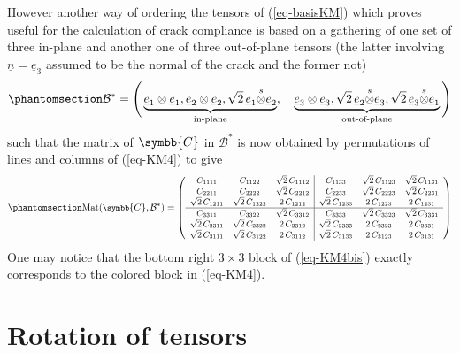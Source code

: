 \documentclass[
  a4paper,
  numbers=noendperiod,
  DIV=12]{scrreprt}
\newcommand{\uuuu}[1]{{\symbb{{#1}}}}
\newcommand{\uv}[1]{{\underline{{#1}}}}
\newcommand{\ve}[1]{{\uv{{e}}_{{#1}}}}
\newcommand{\n}{{\uv{{n}}}}
\newcommand{\sotimes}{{\stackrel{s}{\otimes}}}
\DeclareMathOperator{\Mat}{Mat}
\begin{document}
However another way of ordering the tensors of (\ref{eq-basisKM}) which
proves useful for the calculation of crack compliance is based on a
gathering of one set of three in-plane and another one of three
out-of-plane tensors (the latter involving \(\n=\ve{3}\) assumed to be
the normal of the crack and the former not)
\begin{equation}\protect\phantomsection\label{eq-basisKM2}{
\mathcal{B}^*=\Bigg(
\underbrace{
\ve{1}\otimes\ve{1},
\ve{2}\otimes\ve{2},
\sqrt{2}\,\ve{1}\sotimes\ve{2}
}_{\textrm{in-plane}},
\quad
\underbrace{
\ve{3}\otimes\ve{3},
\sqrt{2}\,\ve{2}\sotimes\ve{3},
\sqrt{2}\,\ve{3}\sotimes\ve{1}
}_{\textrm{out-of-plane}}
\Bigg)
}\end{equation} such that the matrix of \(\uuuu{C}\) in
\(\mathcal{B}^*\) is now obtained by permutations of lines and columns
of (\ref{eq-KM4}) to give
\begin{equation}\protect\phantomsection\label{eq-KM4bis}{
\small
\Mat(\uuuu{C},\mathcal{B}^*)=
   \left(
   \begin{array}{ccc|ccc}
   C_{1111} & C_{1122} & \sqrt{2}\,C_{1112} & C_{1133} & \sqrt{2}\,C_{1123} & \sqrt{2}\,C_{1131} \\
   C_{2211} & C_{2222} & \sqrt{2}\,C_{2212} & C_{2233} & \sqrt{2}\,C_{2223} & \sqrt{2}\,C_{2231} \\
   \sqrt{2}\,C_{1211} & \sqrt{2}\,C_{1222} & 2\,C_{1212} & \sqrt{2}\,C_{1233} & 2\,C_{1223} & 2\,C_{1231} \\
   \hline
   C_{3311} & C_{3322} & \sqrt{2}\,C_{3312} & C_{3333} & \sqrt{2}\,C_{3323} & \sqrt{2}\,C_{3331} \\
   \sqrt{2}\,C_{2311} & \sqrt{2}\,C_{2322} & 2\,C_{2312} & \sqrt{2}\,C_{2333} & 2\,C_{2323} & 2\,C_{2331} \\
   \sqrt{2}\,C_{3111} & \sqrt{2}\,C_{3122} & 2\,C_{3112} & \sqrt{2}\,C_{3133} & 2\,C_{3123} & 2\,C_{3131}
   \end{array}
   \right)
}\end{equation} One may notice that the bottom right \(3\times 3\) block
of (\ref{eq-KM4bis}) exactly corresponds to the colored block in
(\ref{eq-KM4}).

\section{Rotation of tensors}\label{sec-rottens}
\end{document}
